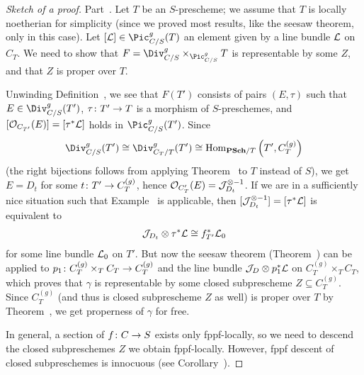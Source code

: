 \documentclass[a4paper,parskip=half,numbers=enddot, DIV=12]{scrreprt}
\begin{document}
\begin{proof}[Sketch of a proof]
	Part~. Let $T$ be an $S$-prescheme; we assume that $T$ is locally noetherian for simplicity (since we proved most results, like the seesaw theorem, only in this case). Let $[\Ll]\in\Pic_{C/S}^g(T)$ an element given by a line bundle $\mathcal{L}$ on $C_T$. We need to show that $F=\Div_{C/S}^g\times_{\Pic_{C/S}^g}T$ is representable by some $Z$, and that $Z$ is proper over $T$.
	
	Unwinding Definition~, we see that $F(T')$ consists of pairs $(E,\tau)$ such that $E\in \Div_{C/S}^g(T')$, $\tau\colon T'\morphism T$ is a morphism of $S$-preschemes, and $[\mathcal{O}_{C_{T'}}(E)]=[\tau^*\mathcal{L}]$ holds in $\Pic_{C/S}^g(T')$. Since
	\begin{align*}
		\Div_{C/S}^g(T')\cong\Div_{C_T/T}^g(T')\cong \Hom_{\cat{PSch}/T}\left(T',C_T^{(g)}\right)
	\end{align*}
	(the right bijections follows from applying Theorem~ to $T$ instead of $S$), we get $E=D_t$ for some $t\colon T'\morphism C_T^{(g)}$, hence $\mathcal{O}_{C_T'}(E)=\mathcal{J}_{D_t}^{\otimes -1}$. If we are in a sufficiently nice situation such that Example~ is applicable, then $[\mathcal{J}_{D_t}^{\otimes -1}]=[\tau^*\mathcal{L}]$ is equivalent to
	\begin{align*}
		\mathcal{J}_{D_t}\otimes\tau^*\mathcal{L}\cong f_{T'}^*\mathcal{L}_0
	\end{align*}
	for some line bundle $\mathcal{L}_0$ on $T'$. But now the seesaw theorem (Theorem~) can be applied to $p_1\colon C_T^{(g)}\times_TC_T\morphism C_T^{(g)}$ and the line bundle $\mathcal{J}_D\otimes p_1^*\mathcal{L}$ on $C_T^{(g)}\times_TC_T$, which proves that $\gamma$ is representable by some closed subprescheme $Z\subseteq C_T^{(g)}$. Since $C_T^{(g)}$ (and thus is closed subprescheme $Z$ as well) is proper over $T$ by Theorem~, we get properness of $\gamma$ for free.
	
	In general, a section of $f\colon C\morphism S$ exists only fppf-locally, so we need to descend the closed subpreschemes $Z$ we obtain fppf-locally. However, fppf descent of closed subpreschemes is innocuous (see Corollary~).
	

\end{proof}
\end{document}
